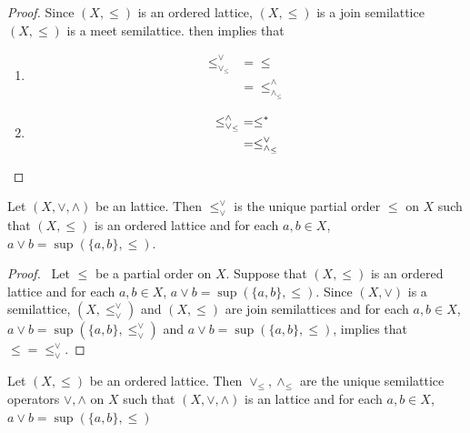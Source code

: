 \documentclass{book}
\begin{document}
	\begin{proof}
		Since $(X, \leq)$ is an ordered lattice, $(X, \leq)$ is a join semilattice $(X, \leq)$ is a meet semilattice.  then implies that 
		\begin{enumerate}
			\item 
			\begin{align*}
				\leq_{\vee_{\leq}}^{\vee} 
				& = \leq \\
				& = \leq_{\wedge_{\leq}}^{\wedge} 
			\end{align*}
			\item 
			\begin{align*}
				\leq_{\vee_{\leq}}^{\wedge}
				& = \leq^* \\
				& = \leq_{\wedge_{\leq}}^{\vee}
			\end{align*}
		\end{enumerate}
	\end{proof}
	
	\begin{ex} 
		Let $(X, \vee, \wedge)$ be an lattice. Then
		$\leq_{\vee}^{\vee}$ is the unique partial order ${\leq}$ on $X$ such that $(X, \leq)$ is an ordered lattice and for each $a,b \in X$, $a \vee b = \sup (\{a,b\}, \leq)$.
	\end{ex}
	
	\begin{proof}\
		Let $\leq$ be a partial order on $X$. Suppose that $(X, \leq)$ is an ordered lattice and for each $a,b \in X$, $a \vee b = \sup (\{a,b\}, \leq)$. Since $(X, \vee)$ is a semilattice, $(X, \leq_{\vee}^{\vee})$ and $(X, \leq)$ are join semilattices and for each $a,b \in X$, $a \vee b = \sup(\{a,b\}, \leq_{\vee}^{\vee})$ and $a \vee b = \sup (\{a,b\}, \leq)$,  implies that ${\leq} = {\leq_{\vee}^{\vee}}$.
	\end{proof}
	
	\begin{ex}  
		Let $(X, \leq)$ be an ordered lattice. Then $\vee_{\leq}, \wedge_{\leq}$ are the unique semilattice operators $\vee, \wedge$ on $X$ such that $(X, \vee, \wedge)$ is an lattice and for each $a,b \in X$, $a \vee b = \sup(\{a,b\}, \leq)$
	\end{ex}
	
\end{document}
